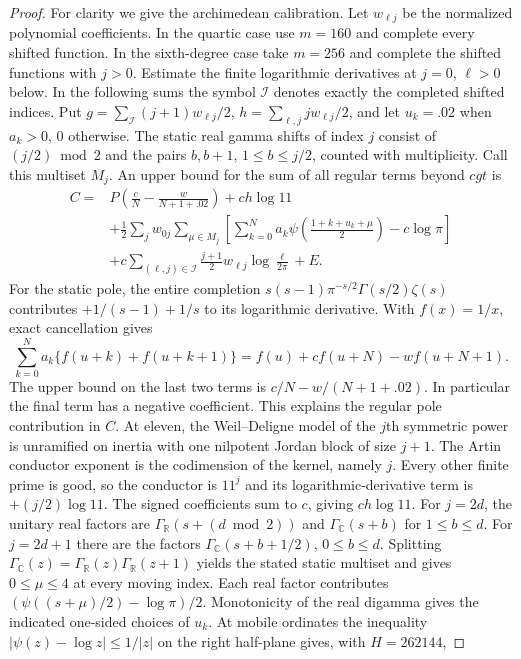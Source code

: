 \documentclass[11pt]{article}
\begin{document}
\begin{proof}
For clarity we give the archimedean calibration. Let $w_{\ell j}$ be the normalized polynomial coefficients. In the quartic case use $m=160$ and complete every shifted function. In the sixth-degree case take $m=256$ and complete the shifted functions with $j>0$. Estimate the finite logarithmic derivatives at $j=0$, $\ell>0$ below. In the following sums the symbol $\mathcal I$ denotes exactly the completed shifted indices. Put $g=\sum_{\mathcal I}(j+1)w_{\ell j}/2$, $h=\sum_{\ell,j}j w_{\ell j}/2$, and let $u_k=.02$ when $a_k>0$, $0$ otherwise. The static real gamma shifts of index $j$ consist of $(j/2)\bmod2$ and the pairs $b,b+1$, $1\le b\le j/2$, counted with multiplicity. Call this multiset $M_j$. An upper bound for the sum of all regular terms beyond $cgt$ is
\begin{align*}
 C={}&P\left(\frac cN-\frac{w}{N+1+.02}\right)+ch\log11\\
 &+\frac12\sum_j w_{0j}\sum_{\mu\in M_j}
     \left[\sum_{k=0}^N a_k\psi\left(\frac{1+k+u_k+\mu}2\right)
                                     -c\log\pi\right]\\
 &+ c\sum_{(\ell,j)\in\mathcal I}\frac{j+1}{2}w_{\ell j}\log\frac{\ell}{2\pi}
   +E.
\end{align*}
For the static pole, the entire completion $s(s-1)\pi^{-s/2}\Gamma(s/2)\zeta(s)$ contributes $+1/(s-1)+1/s$ to its logarithmic derivative. With $f(x)=1/x$, exact cancellation gives
\[
 \sum_{k=0}^N a_k\{f(u+k)+f(u+k+1)\}
 =f(u)+c f(u+N)-w f(u+N+1).
\]
The upper bound on the last two terms is $c/N-w/(N+1+.02)$. In particular the final term has a negative coefficient. This explains the regular pole contribution in $C$. At eleven, the Weil--Deligne model of the $j$th symmetric power is unramified on inertia with one nilpotent Jordan block of size $j+1$. The Artin conductor exponent is the codimension of the kernel, namely $j$. Every other finite prime is good, so the conductor is $11^j$ and its logarithmic-derivative term is $+(j/2)\log11$. The signed coefficients sum to $c$, giving $ch\log11$. For $j=2d$, the unitary real factors are $\Gamma_{\mathbb R}(s+(d\bmod2))$ and $\Gamma_{\mathbb C}(s+b)$ for $1\le b\le d$. For $j=2d+1$ there are the factors $\Gamma_{\mathbb C}(s+b+1/2)$, $0\le b\le d$. Splitting $\Gamma_{\mathbb C}(z)=\Gamma_{\mathbb R}(z)\Gamma_{\mathbb R}(z+1)$ yields the stated static multiset and gives $0\le\mu\le4$ at every moving index. Each real factor contributes $(\psi((s+\mu)/2)-\log\pi)/2$. Monotonicity of the real digamma gives the indicated one-sided choices of $u_k$. At mobile ordinates the inequality $|\psi(z)-\log z|\le1/|z|$ on the right half-plane gives, with $H=262144$,

\end{proof}
\end{document}
